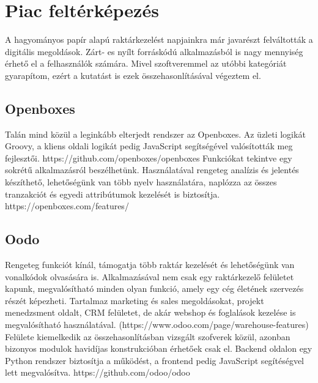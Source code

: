 \chapter{Piac feltérképezés}

A hagyományos papír alapú raktárkezelést napjainkra már javarészt felváltották a digitális megoldások.
Zárt- es nyílt forráskódú alkalmazásból is nagy mennyiség érhető el a felhasználók számára.
Mivel szoftveremmel az utóbbi kategóriát gyarapítom, ezért a kutatást is ezek összehasonlításával végeztem el.

\section{Openboxes}
Talán mind közül a leginkább elterjedt rendszer az Openboxes. Az üzleti logikát Groovy, a kliens oldali logikát pedig JavaScript segítségével valósították meg fejlesztői. https://github.com/openboxes/openboxes
Funkciókat tekintve egy sokrétű alkalmazásról beszélhetünk. Használatával rengeteg analízis és jelentés készíthető, lehetőségünk van több nyelv használatára, naplózza az összes tranzakciót és egyedi attribútumok kezelését is biztosítja.
https://openboxes.com/features/

\section{Oodo}
Rengeteg funkciót kínál, támogatja több raktár kezelését és lehetőségünk van vonalkódok olvasására is. Alkalmazásával nem csak egy raktárkezelő felületet kapunk, megvalósítható minden olyan funkció, amely egy cég életének szervezés részét képezheti. Tartalmaz marketing és sales megoldásokat, projekt menedzsment oldalt, CRM felületet, de akár webshop és foglalások kezelése is megvalósítható használatával.  (https://www.odoo.com/page/warehouse-features)
Felülete kiemelkedik az összehasonlításban vizsgált szofverek közül, azonban bizonyos modulok havidíjas konstrukcióban érhetőek csak el.
Backend oldalon egy Python rendszer biztosítja a működést, a frontend pedig JavaScript segítéségvel lett megvalósítva.
https://github.com/odoo/odoo

